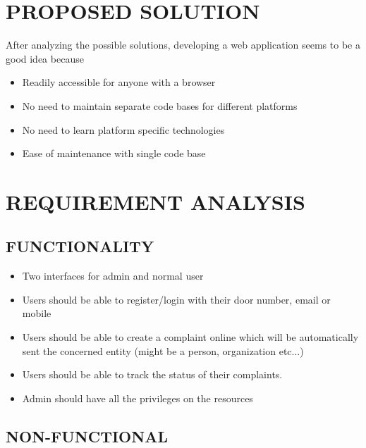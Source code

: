 \documentclass[a4paper, 10pt, conference]{ieeeconf}
\begin{document}
\section{PROPOSED SOLUTION}
After analyzing the possible solutions, developing a web application seems to be a good idea because

\begin{itemize}
    \item Readily accessible for anyone with a browser
    \item No need to maintain separate code bases for different platforms
    \item No need to learn platform specific technologies
    \item Ease of maintenance with single code base
\end{itemize}


\addtolength{\textheight}{-12cm}


\section*{REQUIREMENT ANALYSIS}

\subsection{FUNCTIONALITY}

\begin{itemize}
    \item Two interfaces for admin and normal user
    \item Users should be able to register/login with their door number, email or mobile
    \item Users should be able to create a complaint online which will be automatically sent the concerned entity (might be a person, organization etc...)
    \item Users should be able to track the status of their complaints.
    \item Admin should have all the privileges on the resources
\end{itemize}

\subsection{NON-FUNCTIONAL}
\end{document}
